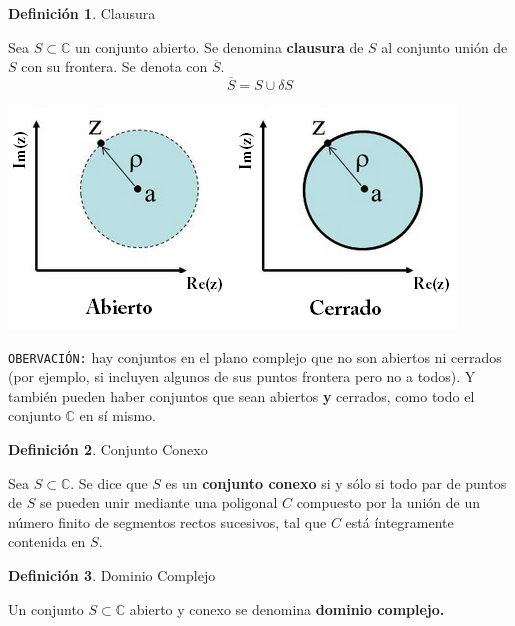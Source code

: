 \documentclass[12pt]{article}
\theoremstyle{definition}
\newtheorem{definition}{Definici\'on}[section]
\begin{document}
\colorbox{green!40!white!80}{\parbox{\linewidth}{
\theoremstyle{definition}
\begin{definition} Clausura

Sea $S \subset \mathbb{C}$ un conjunto abierto. Se denomina \textbf{clausura} de $S$ al conjunto uni\'on de $S$ con su frontera. Se denota con $\overline{S}$.
$$\overline{S} = S \cup \delta S$$

\end{definition}}}
\linebreak

\begin{center}
	\includegraphics[scale=0.8]{tiposConjuntos.png}
\end{center}

\texttt{OBERVACI\'ON:} hay conjuntos en el plano complejo que no son abiertos ni cerrados (por ejemplo, si incluyen algunos de sus puntos frontera pero no a todos). Y tambi\'en pueden haber conjuntos que sean abiertos \textbf{y} cerrados, como todo el conjunto $\mathbb{C}$ en s\'i mismo.\\

\colorbox{green!40!white!80}{\parbox{\linewidth}{
\theoremstyle{definition}
\begin{definition} Conjunto Conexo

Sea $S \subset \mathbb{C}$. Se dice que $S$ es un \textbf{conjunto conexo} si y s\'olo si todo par de puntos de $S$ se pueden unir mediante una poligonal $C$ compuesto por la uni\'on de un n\'umero finito de segmentos rectos sucesivos, tal que $C$ est\'a \'integramente contenida en $S$.

\end{definition}}}
\linebreak
\linebreak

\colorbox{green!40!white!80}{\parbox{\linewidth}{
\theoremstyle{definition}
\begin{definition} Dominio Complejo

Un conjunto $S \subset \mathbb{C}$ abierto y conexo se denomina \textbf{dominio complejo.} 

\end{definition}}}
\linebreak
\linebreak
\end{document}
